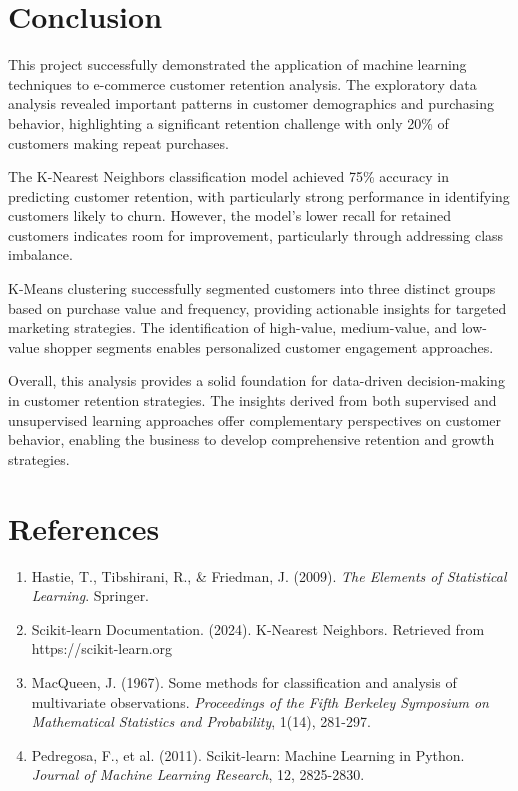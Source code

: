 \documentclass[12pt,a4paper]{article}
\begin{document}
\section{Conclusion}
This project successfully demonstrated the application of machine learning techniques to e-commerce customer retention analysis. The exploratory data analysis revealed important patterns in customer demographics and purchasing behavior, highlighting a significant retention challenge with only 20\% of customers making repeat purchases.

The K-Nearest Neighbors classification model achieved 75\% accuracy in predicting customer retention, with particularly strong performance in identifying customers likely to churn. However, the model's lower recall for retained customers indicates room for improvement, particularly through addressing class imbalance.

K-Means clustering successfully segmented customers into three distinct groups based on purchase value and frequency, providing actionable insights for targeted marketing strategies. The identification of high-value, medium-value, and low-value shopper segments enables personalized customer engagement approaches.

Overall, this analysis provides a solid foundation for data-driven decision-making in customer retention strategies. The insights derived from both supervised and unsupervised learning approaches offer complementary perspectives on customer behavior, enabling the business to develop comprehensive retention and growth strategies.

\section{References}
\begin{enumerate}
    \item Hastie, T., Tibshirani, R., \& Friedman, J. (2009). \textit{The Elements of Statistical Learning}. Springer.
    \item Scikit-learn Documentation. (2024). K-Nearest Neighbors. Retrieved from https://scikit-learn.org
    \item MacQueen, J. (1967). Some methods for classification and analysis of multivariate observations. \textit{Proceedings of the Fifth Berkeley Symposium on Mathematical Statistics and Probability}, 1(14), 281-297.
    \item Pedregosa, F., et al. (2011). Scikit-learn: Machine Learning in Python. \textit{Journal of Machine Learning Research}, 12, 2825-2830.
\end{enumerate}
\end{document}
